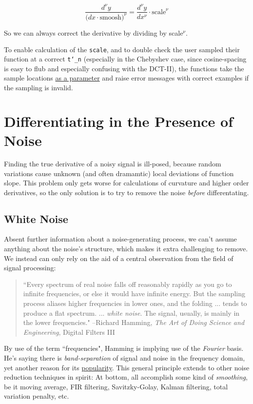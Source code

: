 \documentclass[10pt]{article}
\begin{document}
$$\frac{d^\nu y}{\big( dx \cdot \text{smoosh})^\nu} = \frac{d^\nu y}{dx^\nu} \cdot \text{scale}^\nu$$

So we can always correct the derivative by dividing by scale$^\nu$.\newline

To enable calculation of the \texttt{scale}, and to double check the user sampled their function at a correct \texttt{t\char`_n} (especially in the Chebyshev case, since cosine-spacing is easy to flub and especially confusing with the DCT-II), the functions take the sample locations \href{https://pavelkomarov.com/spectral-derivatives/specderiv.html}{as a parameter} and raise error messages with correct examples if the sampling is invalid.

\section{Differentiating in the Presence of Noise}

Finding the true derivative of a noisy signal is ill-posed, because random variations cause unknown (and often dramamtic) local deviations of function slope. This problem only gets worse for calculations of curvature and higher order derivatives, so the only solution is to try to remove the noise \textit{before} differentating.

\subsection{White Noise}

Absent further information about a noise-generating process, we can't assume anything about the noise's structure, which makes it extra challenging to remove. We instead can only rely on the aid of a central observation from the field of signal processing:

\begin{quotation}
``Every spectrum of real noise falls off reasonably rapidly as you go to infinite frequencies, or else it would have infinite energy. But the sampling process aliases higher frequencies in lower ones, and the folding ... tends to produce a flat spectrum. ... \textit{white noise}. The signal, usually, is mainly in the lower frequencies." --Richard Hamming, \textit{The Art of Doing Science and Engineering}\cite{hamming}, Digital Filters III
\end{quotation}

By use of the term ``frequencies", Hamming is implying use of the \textit{Fourier} basis. He's saying there is \textit{band-separation} of signal and noise in the frequency domain, yet another reason for its \hyperref[whyfourier]{popularity}. This general principle extends to other noise reduction techniques in spirit: At bottom, all accomplish some kind of \textit{smoothing}, be it moving average, FIR filtering, Savitzky-Golay, Kalman filtering, total variation penalty, etc.
\end{document}
